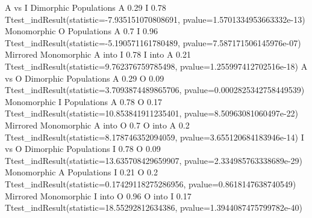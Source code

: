 A vs I
Dimorphic Populations
A 0.29
I 0.78
Ttest_indResult(statistic=-7.935151070808691, pvalue=1.5701334953663332e-13)
Monomorphic O Populations
A 0.7
I 0.96
Ttest_indResult(statistic=-5.190571161780489, pvalue=7.587171506145976e-07)
Mirrored Monomorphic
A into I 0.78
I into A 0.21
Ttest_indResult(statistic=9.762376759785498, pvalue=1.255997412702516e-18)
A vs O
Dimorphic Populations
A 0.29
O 0.09
Ttest_indResult(statistic=3.7093874489865706, pvalue=0.0002825342758449539)
Monomorphic I Populations
A 0.78
O 0.17
Ttest_indResult(statistic=10.853841911235401, pvalue=8.50963081060497e-22)
Mirrored Monomorphic
A into O 0.7
O into A 0.2
Ttest_indResult(statistic=8.178746352094059, pvalue=3.655120684183946e-14)
I vs O
Dimorphic Populations
I 0.78
O 0.09
Ttest_indResult(statistic=13.635708429659907, pvalue=2.334985763338689e-29)
Monomorphic A Populations
I 0.21
O 0.2
Ttest_indResult(statistic=0.17429118275286956, pvalue=0.8618147638740549)
Mirrored Monomorphic
I into O 0.96
O into I 0.17
Ttest_indResult(statistic=18.55292812634386, pvalue=1.3944087475799782e-40)

